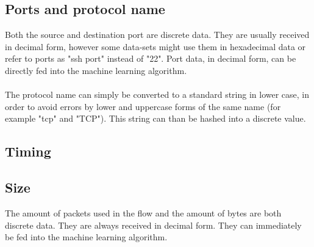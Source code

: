 \subsection{Ports and protocol name}
Both the source and destination port are discrete data. They are usually received in decimal form, however some data-sets might use them in hexadecimal data or refer to ports as "ssh port" instead of "22". Port data, in decimal form, can be directly fed into the machine learning algorithm.\\
\\
The protocol name can simply be converted to a standard string in lower case, in order to avoid errors by lower and uppercase forms of the same name (for example "tcp" and "TCP"). This string can than be hashed into a discrete value.

\subsection{Timing}

\subsection{Size} 
The amount of packets used in the flow and the amount of bytes are both discrete data. They are always received in decimal form. They can immediately be fed into the machine learning algorithm.
